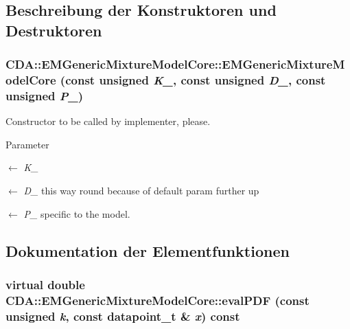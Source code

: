 \subsection{Beschreibung der Konstruktoren und Destruktoren}
\hypertarget{classCDA_1_1EMGenericMixtureModelCore_abbba5d71163475e49ac5334d32dce5ad}{
\subsubsection[{EMGenericMixtureModelCore}]{\setlength{\rightskip}{0pt plus 5cm}CDA::EMGenericMixtureModelCore::EMGenericMixtureModelCore (const unsigned {\em K\_\-}, \/  const unsigned {\em D\_\-}, \/  const unsigned {\em P\_\-})}}
\label{classCDA_1_1EMGenericMixtureModelCore_abbba5d71163475e49ac5334d32dce5ad}


Constructor to be called by implementer, please. 


\begin{DoxyParams}{Parameter}
\item[\mbox{$\leftarrow$} {\em K\_\-}]\item[\mbox{$\leftarrow$} {\em D\_\-}]this way round because of default param further up \item[\mbox{$\leftarrow$} {\em P\_\-}]specific to the model. \end{DoxyParams}


\subsection{Dokumentation der Elementfunktionen}
\hypertarget{classCDA_1_1EMGenericMixtureModelCore_a3f291b20f5345b1e302bf46338d2f5f3}{
\subsubsection[{evalPDF}]{\setlength{\rightskip}{0pt plus 5cm}virtual double CDA::EMGenericMixtureModelCore::evalPDF (const unsigned {\em k}, \/  const {\bf datapoint\_\-t} \& {\em x}) const}}
\label{classCDA_1_1EMGenericMixtureModelCore_a3f291b20f5345b1e302bf46338d2f5f3}


